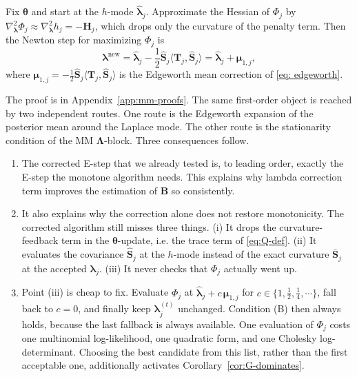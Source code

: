 \begin{proposition}
Fix $\bm{\theta}$ and start at the $h$-mode $\hat{\bm{\lambda}}_{j}$. Approximate the Hessian of $\Phi_{j}$ by $\nabla^{2}_{\bm{\lambda}}\Phi_{j}\approx\nabla^{2}_{\bm{\lambda}}h_{j}=-\mathbf{H}_{j}$, which drops only the curvature of the penalty term. Then the Newton step for maximizing $\Phi_{j}$ is
\begin{equation}
    \bm{\lambda}^{\mathrm{new}}=\hat{\bm{\lambda}}_{j}-\frac{1}{2}\hat{\mathbf{S}}_{j}\big\langle\mathbf{T}_{j},\hat{\mathbf{S}}_{j}\big\rangle=\hat{\bm{\lambda}}_{j}+\bm{\mu}_{1,j},
    \label{eq:newton-step}
\end{equation}
where $\bm{\mu}_{1,j}=-\frac{1}{2}\hat{\mathbf{S}}_{j}\big\langle\mathbf{T}_{j},\hat{\mathbf{S}}_{j}\big\rangle$ is the Edgeworth mean correction of \eqref{eq: edgeworth}.
\label{prop:newton-edgeworth}
\end{proposition}
 
The proof is in Appendix~\ref{app:mm-proofs}. The same first-order object is reached by two independent routes. One route is the Edgeworth expansion of the posterior mean around the Laplace mode. The other route is the stationarity condition of the MM $\bm{\Lambda}$-block. Three consequences follow.
\begin{enumerate}
    \item The corrected E-step that we already tested is, to leading order, exactly the E-step the monotone algorithm needs. This explains why lambda correction term improves the estimation of $\mathbf{B}$ so consistently.
    \item It also explains why the correction alone does not restore monotonicity. The corrected algorithm still misses three things. (i) It drops the curvature-feedback term in the $\bm{\theta}$-update, i.e. the trace term of \eqref{eq:Q-def}. (ii) It evaluates the covariance $\hat{\mathbf{S}}_{j}$ at the $h$-mode instead of the exact curvature $\bar{\mathbf{S}}_{j}$ at the accepted $\bm{\lambda}_{j}$. (iii) It never checks that $\Phi_{j}$ actually went up.
    \item Point (iii) is cheap to fix. Evaluate $\Phi_{j}$ at $\hat{\bm{\lambda}}_{j}+c\,\bm{\mu}_{1,j}$ for $c\in\{1,\tfrac{1}{2},\tfrac{1}{4},\cdots\}$, fall back to $c=0$, and finally keep $\bm{\lambda}_{j}^{(t)}$ unchanged. Condition (B) then always holds, because the last fallback is always available. One evaluation of $\Phi_{j}$ costs one multinomial log-likelihood, one quadratic form, and one Cholesky log-determinant. Choosing the best candidate from this list, rather than the first acceptable one, additionally activates Corollary~\ref{cor:G-dominates}.
\end{enumerate}
 
